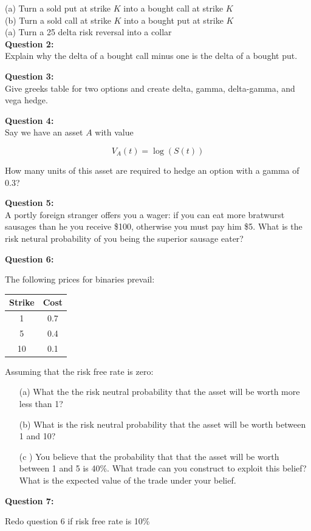 (a) Turn a sold put at strike $K$ into a bought call at strike $K$\\
(b) Turn a sold call at strike $K$ into a bought put at strike $K$\\
(a) Turn a 25 delta risk reversal into a collar\\

\textbf{Question 2:}\\
Explain why the delta of a bought call minus one is the delta of a bought put.

\textbf{Question 3:}\\

Give greeks table for two options and create delta, gamma, delta-gamma, and vega hedge.


\textbf{Question 4:}\\

Say we have an asset $A$ with value 

\[V_A(t) = \log (S(t) ) \]

How many units of this asset are required to hedge an option with a gamma of 0.3?

\textbf{Question 5:}\\

A portly foreign stranger offers you a wager: if you can eat more bratwurst sausages than he you receive \$100, otherwise you must pay him \$5. What is the risk netural probability of you being the superior sausage eater?

\textbf{Question 6:}

The following prices for binaries prevail:

\begin{tabular}{|cc|}
\hline
Strike & Cost\\
\hline
1 & 0.7\\
5 & 0.4\\
10 & 0.1\\
\hline
\end{tabular}

Assuming that the risk free rate is zero:

\begin{itemize}
\item[(a)] What the the risk neutral probability that the asset will be worth more less than 1?
\item[(b)] What is the risk neutral probability that the asset will be worth between 1 and 10?
\item[(c )] You believe that the probability that that the asset will be worth between 1 and 5 is 40\%. What trade can you construct to exploit this belief? What is the expected value of the trade under your belief.
\end{itemize}

\textbf{Question 7:}

Redo question 6 if risk free rate is 10\% 

